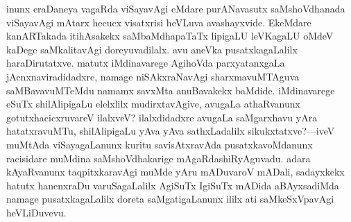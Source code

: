 \documentclass[11pt,a4size]{article}
\begin{document}
inunx eraDaneya vagaRda viSayavAgi eMdare purANavasutx saMshoVdhanada
viSayavAgi mAtarx hecucx visatxrisi heVLuva avashayxvide. EkeMdare
kanARTakada itihAsakekx saMbaMdhapaTaTx lipigaLU leVKagaLU oMdeV
kaDege saMkalitavAgi doreyuvadilalx. avu aneVka pusatxkagaLalilx
haraDirutatxve. matutx iMdinavarege AgihoVda parxyatanxgaLa
jAcnxnaviradidadxre, namage niSAkxraNavAgi sharxmavuMTAguva
saMBavavuMTeMdu namamx savxMta anuBavakekx baMdide. iMdinavarege eSuTx
shilAlipigaLu elelxlilx mudirxtavAgive, avugaLa athaRvanunx
gotutxhacicxruvareV ilalxveV? ilalxdidadxre avugaLa saMgarxhavu yAra
hatatxravuMTu, shilAlipigaLu yAva yAva sathxLadalilx
sikukxtatxve?---iveV muMtAda viSayagaLanunx kuritu savisAtxravAda
pusatxkavoMdanunx racisidare muMdina saMshoVdhakarige
mAgaRdashiRyAguvadu. adara kAyaRvanunx taqpitxkaravAgi muMde yAru
mADuvaroV mADali, sadayxkekx hatutx hanenxraDu varuSagaLalilx AgiSuTx
IgiSuTx mADida aBAyxsadiMda namage pusatxkagaLalilx doreta
saMgatigaLanunx ililx ati saMkeSxVpavAgi heVLiDuvevu.
\end{document}

